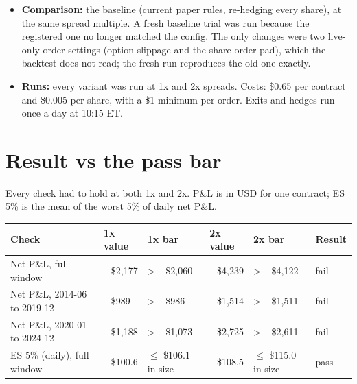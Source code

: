 \documentclass{article}
\begin{document}
\begin{itemize}
\begin{itemize}
\item \texttt{trend15}: a 15-share band in a trend. A sensitivity.

\end{itemize}

\item \textbf{Comparison:} the baseline (current paper rules, re-hedging every share), at the same spread multiple. A fresh baseline trial was run because the registered one no longer matched the config. The only changes were two live-only order settings (option slippage and the share-order pad), which the backtest does not read; the fresh run reproduces the old one exactly.

\item \textbf{Runs:} every variant was run at 1x and 2x spreads. Costs: \$0.65 per contract and \$0.005 per share, with a \$1 minimum per order. Exits and hedges run once a day at 10:15 ET.

\end{itemize}

\section{Result vs the pass bar}

Every check had to hold at both 1x and 2x. P\&L is in USD for one contract; ES 5\% is the mean of the worst 5\% of daily net P\&L.

\begin{center}\small
\begin{tabularx}{\linewidth}{>{\raggedright\arraybackslash}X l >{\raggedright\arraybackslash}X l >{\raggedright\arraybackslash}X l}
\toprule
\textbf{Check} & \textbf{1x value} & \textbf{1x bar} & \textbf{2x value} & \textbf{2x bar} & \textbf{Result} \\
\midrule
Net P\&L, full window & \ensuremath{-}\$2,177 & > \ensuremath{-}\$2,060 & \ensuremath{-}\$4,239 & > \ensuremath{-}\$4,122 & fail \\
Net P\&L, 2014-06 to 2019-12 & \ensuremath{-}\$989 & > \ensuremath{-}\$986 & \ensuremath{-}\$1,514 & > \ensuremath{-}\$1,511 & fail \\
Net P\&L, 2020-01 to 2024-12 & \ensuremath{-}\$1,188 & > \ensuremath{-}\$1,073 & \ensuremath{-}\$2,725 & > \ensuremath{-}\$2,611 & fail \\
ES 5\% (daily), full window & \ensuremath{-}\$100.6 & \ensuremath{\leq} \$106.1 in size & \ensuremath{-}\$108.5 & \ensuremath{\leq} \$115.0 in size & pass \\
\bottomrule
\end{tabularx}
\end{center}
\end{document}
